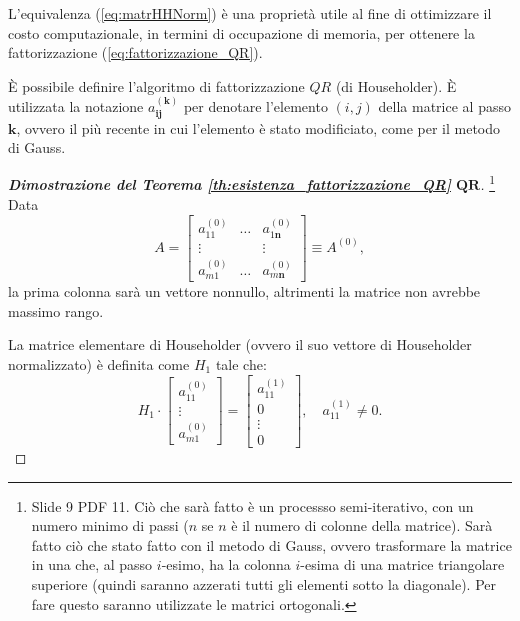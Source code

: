 L'equivalenza (\ref{eq:matrHHNorm}) è una proprietà utile al fine di ottimizzare il costo computazionale, in termini di occupazione di memoria, per ottenere la fattorizzazione (\ref{eq:fattorizzazione_QR}).

È possibile definire l'algoritmo di fattorizzazione $QR$ (di Householder). È utilizzata la notazione $a_{\boldsymbol{ij}}^{\boldsymbol{(k)}}$ per denotare l'elemento $(i,j)$ della matrice al passo $\boldsymbol k$, ovvero il più recente in cui l'elemento è stato modificiato, come per il metodo di Gauss.

\label{ssssec:dimostrazione_esistenza_fattorizzazione_QR}
\begin{proof}[\textbf{Dimostrazione del Teorema \ref{th:esistenza_fattorizzazione_QR}} $\boldsymbol{QR}$]\footnote{Slide 9 PDF 11. Ciò che sarà fatto è un processso semi-iterativo, con un numero minimo di passi ($n$ se $n$ è il numero di colonne della matrice). Sarà fatto ciò che stato fatto con il metodo di Gauss, ovvero trasformare la matrice in una che, al passo $i$-esimo, ha la colonna $i$-esima di una matrice triangolare superiore (quindi saranno azzerati tutti gli elementi sotto la diagonale). Per fare questo saranno utilizzate le matrici ortogonali.}
    Data
    \begin{equation*}
        A=\begin{bmatrix}
            a_{11}^{(0)}& \hdots & a_{1\boldsymbol n}^{(0)}\\
            \vdots & & \vdots\\
            a_{m1}^{(0)} &\hdots & a_{m\boldsymbol n}^{(0)}
        \end{bmatrix}\equiv A^{(0)},
    \end{equation*}
    la prima colonna sarà un vettore nonnullo, altrimenti la matrice non avrebbe massimo rango.
    
    La matrice elementare di Householder (ovvero il suo vettore di Householder normalizzato) è definita come $H_1$ tale che:
    \begin{equation*}
        H_1\cdot\begin{bmatrix}
            a_{11}^{(0)}\\
            \vdots\\
            a_{m1}^{(0)}
        \end{bmatrix}=\begin{bmatrix}
            a_{11}^{(1)}\\
            0\\
            \vdots\\
            0
        \end{bmatrix},\quad a_{11}^{(1)}\neq 0.
    \end{equation*}
    

\end{proof}
